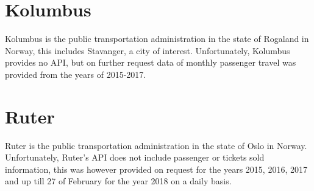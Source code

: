\section{Kolumbus}
Kolumbus is the public transportation administration in the state of Rogaland in Norway, this includes Stavanger, a city of interest. Unfortunately, Kolumbus provides no API, but on further request data of monthly passenger travel was provided from the years of 2015-2017.

\section{Ruter}
Ruter is the public transportation administration in the state of Oslo in Norway. Unfortunately, Ruter's API does not include passenger or tickets sold information, this was however provided on request for the years 2015, 2016, 2017 and up till 27 of February for the year 2018 on a daily basis.